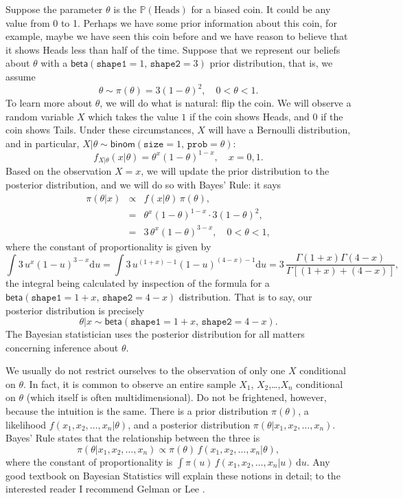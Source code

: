 Suppose the parameter \(\theta\) is the \(\mathbb{P}(\mbox{Heads})\)
for a biased coin. It could be any value from 0 to 1. Perhaps we have
some prior information about this coin, for example, maybe we have
seen this coin before and we have reason to believe that it shows
Heads less than half of the time. Suppose that we represent our
beliefs about \(\theta\) with a
\(\mathsf{beta}(\mathtt{shape1}=1,\,\mathtt{shape2}=3)\) prior
distribution, that is, we assume \[
\theta\sim\pi(\theta)=3(1-\theta)^{2},\quad 0 < \theta < 1.  \] To
learn more about \(\theta\), we will do what is natural: flip the
coin. We will observe a random variable \(X\) which takes the value
\(1\) if the coin shows Heads, and 0 if the coin shows Tails. Under
these circumstances, \(X\) will have a Bernoulli distribution, and in
particular,
\(X|\theta\sim\mathsf{binom}(\mathtt{size}=1,\,\mathtt{prob}=\theta)\):
\[ f_{X|\theta}(x|\theta)=\theta^{x}(1-\theta)^{1-x},\quad x=0,1.  \]
Based on the observation \(X=x\), we will update the prior
distribution to the posterior distribution, and we will do so with
Bayes' Rule: it says
\begin{eqnarray*}
\pi(\theta|x) & \propto & f(x|\theta) \, \pi(\theta),\\
 & = & \theta^{x}(1-\theta)^{1-x}\cdot3(1-\theta)^{2},\\
 & = & 3\,\theta^{x}(1-\theta)^{3-x},\quad 0 < \theta < 1,
\end{eqnarray*}
where the constant of proportionality is given by \[ \int3\,
u^{x}(1-u)^{3-x}\mathrm{d} u=\int3\,
u^{(1+x)-1}(1-u)^{(4-x)-1}\mathrm{d}
u=3\,\frac{\Gamma(1+x)\Gamma(4-x)}{\Gamma[(1+x)+(4-x)]}, \] the
integral being calculated by inspection of the formula for a
\(\mathsf{beta}(\mathtt{shape1}=1+x,\,\mathtt{shape2}=4-x)\)
distribution. That is to say, our posterior distribution is precisely
\[
\theta|x\sim\mathsf{beta}(\mathtt{shape1}=1+x,\,\mathtt{shape2}=4-x).
\] The Bayesian statistician uses the posterior distribution for all
matters concerning inference about \(\theta\).



\begin{rem}
We usually do not restrict ourselves to the observation of only one
\(X\) conditional on \(\theta\). In fact, it is common to observe an
entire sample \(X_{1}\), \(X_{2}\),\ldots{},\(X_{n}\) conditional on
\(\theta\) (which itself is often multidimensional). Do not be
frightened, however, because the intuition is the same. There is a
prior distribution \(\pi(\theta)\), a likelihood
\(f(x_{1},x_{2},\ldots,x_{n}|\theta)\), and a posterior distribution
\(\pi(\theta|x_{1},x_{2},\ldots,x_{n})\). Bayes' Rule states that the
relationship between the three is \[
\pi(\theta|x_{1},x_{2},\ldots,x_{n})\propto\pi(\theta)\,
f(x_{1},x_{2},\ldots,x_{n}|\theta), \] where the constant of
proportionality is \(\int\pi(u)\,
f(x_{1},x_{2},\ldots,x_{n}|u)\,\mathrm{d} u\). Any good textbook on
Bayesian Statistics will explain these notions in detail; to the
interested reader I recommend Gelman \cite{Gelman2004} or Lee
\cite{Lee1997}.
\end{rem}

